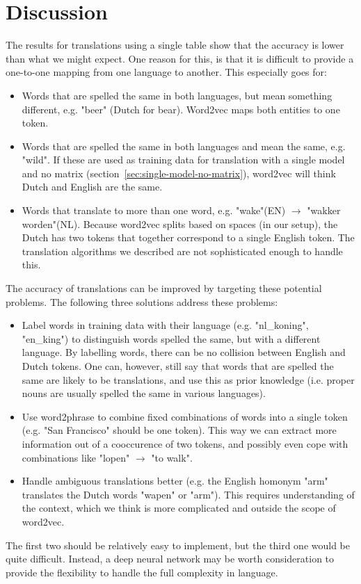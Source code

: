 \section{Discussion}
\label{sec:discussion}
The results for translations using a single table show that the accuracy is lower than what we might expect. One reason for this, is that it is difficult to provide a one-to-one mapping from one language to another. This especially goes for:
\begin{itemize}
\item Words that are spelled the same in both languages, but mean something different, e.g. "beer" (Dutch for bear). Word2vec maps both entities to one token.
\item Words that are spelled the same in both languages and mean the same, e.g. "wild". If these are used as training data for translation with a single model and no matrix (section~\ref{sec:single-model-no-matrix}), word2vec will think Dutch and English are the same.
\item Words that translate to more than one word, e.g. "wake"(EN) $\to$ "wakker worden"(NL). Because word2vec splits based on spaces (in our setup), the Dutch has two tokens that together correspond to a single English token. The translation algorithms we described are not sophisticated enough to handle this.
\end{itemize}

The accuracy of translations can be improved by targeting these potential problems. The following three solutions address these problems:

\begin{itemize}
\item Label words in training data with their language (e.g. "nl\_koning", "en\_king") to distinguish words spelled the same, but with a different language. By labelling words, there can be no collision between English and Dutch tokens. One can, however, still say that words that are spelled the same are likely to be translations, and use this as prior knowledge (i.e. proper nouns are usually spelled the same in various languages).
\item Use word2phrase to combine fixed combinations of words into a single token (e.g. "San Francisco" should be one token). This way we can extract more information out of a cooccurence of two tokens, and possibly even cope with combinations like "lopen" $\to$ "to walk".
\item Handle ambiguous translations better (e.g. the English homonym "arm" translates the Dutch words "wapen" or "arm"). This requires understanding of the context, which we think is more complicated and outside the scope of word2vec.
\end{itemize}

The first two should be relatively easy to implement, but the third one would be quite difficult. Instead, a deep neural network may be worth consideration to provide the flexibility to handle the full complexity in language.